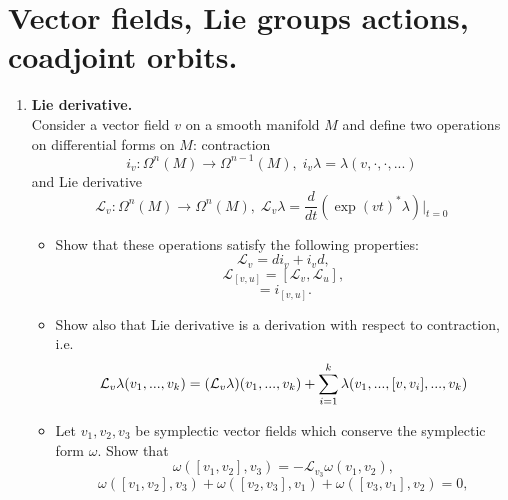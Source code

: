 \documentclass[12pt]{article}
\theoremstyle{definition}
\begin{document}
\section{Vector fields, Lie groups actions, coadjoint orbits.}
\begin{enumerate}
    \item \textbf{Lie derivative.}\\
    Consider a vector field $v$ on a smooth manifold $M$ and define two operations on differential forms on $M$: contraction
    \begin{equation}
        i_v:\Omega^{n}(M)\rightarrow\Omega^{n-1}(M),\; i_v\lambda=\lambda(v,\cdot,\cdot,...)
    \end{equation}
    and Lie derivative
    \begin{equation}
        \mathcal{L}_v:\Omega^n(M)\rightarrow \Omega^{n}(M), \; \mathcal{L}_v\lambda=\frac{d}{dt}(\exp(vt)^*\lambda)\big|_{t=0}
    \end{equation}
\begin{itemize}
    \item  Show that these operations satisfy the following properties:
    \begin{equation}
        \mathcal{L}_v=di_v+i_vd,
    \end{equation}
    \begin{equation}
        \mathcal{L}_{[v,u]} = [\mathcal{L}_{v},\mathcal{L}_{u}],
    \end{equation}
    \begin{equation}
        [\mathcal{L}_v, i_u] =i_{[v,u]}.
    \end{equation}
    \item Show also that Lie derivative is a derivation with respect to contraction, i.e.
    \begin{equation}
        \mathcal{L}_{v}\lambda(v_1, . . . ,v_k) = (\mathcal{L}_{v}\lambda)(v_1, . . . , v_k) +\sum_{i=1}^k\limits\lambda(v_1, . . . , [v,v_i], . . . , v_k)
    \end{equation}
    \item Let $v_1, v_2, v_3$ be symplectic vector fields which conserve the symplectic form $\omega$. Show that
    \begin{equation}
        \omega([v_1,v_2], v_3) = -\mathcal{L}_{v_3} \omega(v_1, v_2),
    \end{equation}
    \begin{equation}
        \omega([v_1, v_2],v_3) + \omega([v_2, v_3], v_1) +\omega([v_3,v_1],v_2) = 0,
    \end{equation}

\end{itemize}
\end{enumerate}
\end{document}
